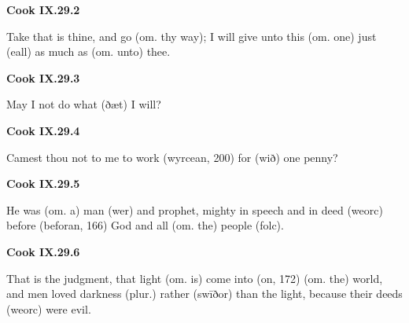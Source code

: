 \par\begin{minipage}{\linewidth}\raggedright
\textbf{Cook IX.29.2}

Take that is thine, and go (om. thy way); I will give unto this (om. one) just (eall) as much as (om. unto) thee.

\end{minipage}\par\addvspace{4pt}

\par\begin{minipage}{\linewidth}\raggedright
\textbf{Cook IX.29.3}

May I not do what (ðæt) I will?

\end{minipage}\par\addvspace{4pt}

\par\begin{minipage}{\linewidth}\raggedright
\textbf{Cook IX.29.4}

Camest thou not to me to work (wyrcean, 200) for (wið) one penny?

\end{minipage}\par\addvspace{4pt}

\par\begin{minipage}{\linewidth}\raggedright
\textbf{Cook IX.29.5}

He was (om. a) man (wer) and prophet, mighty in speech and in deed (weorc) before (beforan, 166) God and all (om. the) people (folc).

\end{minipage}\par\addvspace{4pt}

\par\begin{minipage}{\linewidth}\raggedright
\textbf{Cook IX.29.6}

That is the judgment, that light (om. is) come into (on, 172) (om. the) world, and men loved darkness (plur.) rather (swīðor) than the light, because their deeds (weorc) were evil.

\end{minipage}\par\addvspace{4pt}

